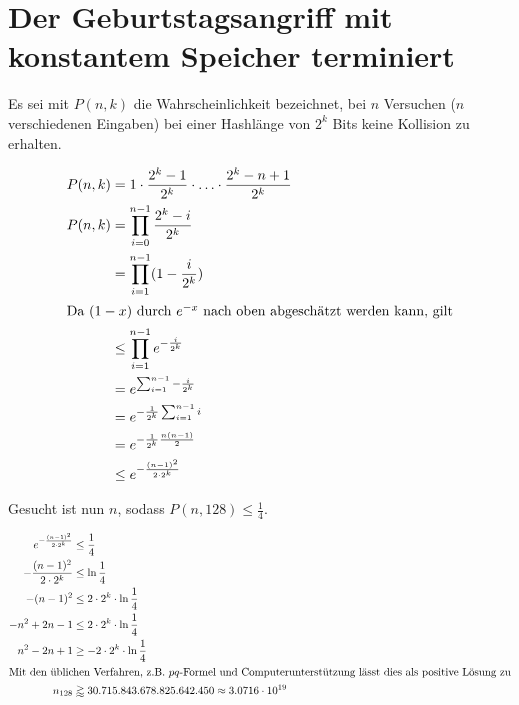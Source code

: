 \documentclass{../crypto}
\date{4. Dezember 2015}
\begin{document}
\maketitle

\section{Der Geburtstagsangriff mit konstantem Speicher terminiert}

Es sei mit $P(n,k)$ die Wahrscheinlichkeit bezeichnet, bei $n$ Versuchen ($n$
verschiedenen Eingaben) bei einer Hashlänge von $2^k$ Bits keine Kollision zu
erhalten.

\begin{align*}
   P(n,k)  & = 1 \cdot \frac{2^k - 1}{2^k} \cdot \ldots \cdot \frac{2^k - n + 1}{2^k} \\
   P(n,k)  & =   \prod_{i=0}^{n-1} \frac{2^k - i}{2^k}                                \\
           & =   \prod_{i=1}^{n-1} (1 -  \frac{i}{2^k})                               \\
\intertext{Da $(1-x)$ durch $e^{-x}$ nach oben abgeschätzt werden kann, gilt}
           & \le \prod_{i=1}^{n-1} e^{-\frac{i}{2^k}} \\
           & =   e^{\sum_{i=1}^{n-1}-\frac{i}{2^k}}   \\
           & =   e^{-\frac{1}{2^k}\sum_{i=1}^{n-1}i}  \\
           & =   e^{-\frac{1}{2^k} \frac{n(n-1)}{2}}  \\
           & \le   e^{-\frac{(n-1)^2}{2\cdot 2^k}}    \\
\end{align*}

Gesucht ist nun $n$, sodass $P(n,128) \le \frac{1}{4}$.

\begin{align*}
   e^{-\frac{(n-1)^2}{2\cdot 2^k}} & \le \frac{1}{4}                        \\
   -\frac{(n-1)^2}{2\cdot 2^k}     & \le \ln{\frac{1}{4}}                   \\
   -(n-1)^2                        & \le 2\cdot 2^k \cdot \ln{\frac{1}{4}}  \\
   -n^2 + 2n - 1                   & \le 2\cdot 2^k \cdot \ln{\frac{1}{4}}  \\
   n^2 - 2n + 1                    & \ge -2\cdot 2^k \cdot \ln{\frac{1}{4}} \\
   \intertext{Mit den üblichen Verfahren, z.B. $pq$-Formel und
   Computerunterstützung lässt dies als positive Lösung zu}
   n_{128}                         & \gtrapprox 30.715.843.678.825.642.450 \approx 3.0716 \cdot 10^{19}
\end{align*}
\end{document}
